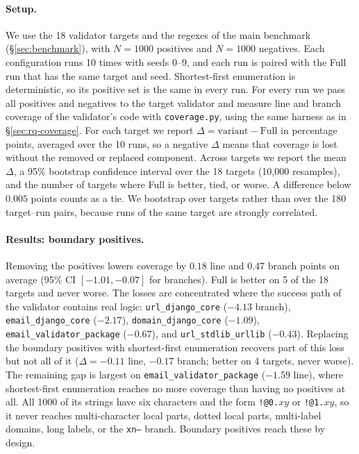 \paragraph{Setup.}
We use the 18 validator targets and the regexes of the main benchmark
(\S\ref{sec:benchmark}), with $N = 1000$ positives and $N = 1000$ negatives. Each
configuration runs 10 times with seeds $0$--$9$, and each run is paired with the
Full run that has the same target and seed. Shortest-first enumeration
is deterministic, so its positive set is the same in every run. For every run we
pass all positives and negatives to the target validator and measure line and
branch coverage of the validator's code with \texttt{coverage.py}, using the same
harness as in \S\ref{sec:rq-coverage}. For each target we report
$\Delta = \text{variant} - \text{Full}$ in percentage points, averaged over the 10
runs, so a negative $\Delta$ means that coverage is lost without the removed or
replaced component. Across targets we report the mean $\Delta$, a 95\% bootstrap confidence
interval over the 18 targets (10{,}000 resamples), and the number of targets where
Full is better, tied, or worse. A difference below $0.005$ points counts as a tie.
We bootstrap over targets rather than over the 180 target--run pairs, because runs
of the same target are strongly correlated.



\paragraph{Results: boundary positives.}
Removing the positives lowers coverage by $0.18$ line and $0.47$ branch points on
average (95\% CI $[-1.01, -0.07]$ for branches). Full is better on 5 of the 18
targets and never worse. The losses are concentrated where the success path of the
validator contains real logic: \texttt{url\_django\_core} ($-4.13$ branch),
\texttt{email\_django\_core} ($-2.17$), \texttt{domain\_django\_core} ($-1.09$),
\texttt{email\_validator\_package} ($-0.67$), and \texttt{url\_stdlib\_urllib}
($-0.43$). Replacing the boundary positives with shortest-first enumeration recovers
part of this loss but not all of it ($\Delta = -0.11$ line, $-0.17$ branch; better on 4
targets, never worse). The remaining gap is largest on
\texttt{email\_validator\_package} ($-1.59$ line), where shortest-first enumeration reaches
no more coverage than having no positives at all. All 1000 of its strings have six
characters and the form \texttt{!@0.}$xy$ or \texttt{!@1.}$xy$, so it never reaches
multi-character local parts, dotted local parts, multi-label domains, long labels,
or the \texttt{xn--} branch. Boundary positives reach these by design.

